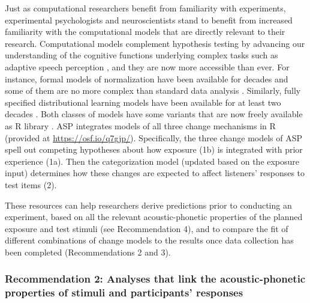 \documentclass[
  11pt,
  man,floatsintext]{apa6}
\begin{document}
Just as computational researchers benefit from familiarity with experiments, experimental psychologists and neuroscientists stand to benefit from increased familiarity with the computational models that are directly relevant to their research. Computational models complement hypothesis testing by advancing our understanding of the cognitive functions underlying complex tasks such as adaptive speech perception \autocite{kriegeskorte2018}, and they are now more accessible than ever. For instance, formal models of normalization have been available for decades and some of them are no more complex than standard data analysis \autocite[e.g., linear regression for C-CuRE,][]{mcmurray-jongman2011}. Similarly, fully specified distributional learning models have been available for at least two decades \autocites[e.g., mixtures of Gaussians,][]{mcmurray2007,toscano-mcmurray2010,feldman2013}[exemplar models,][]{foulkes-hay2015,johnson2005,apfelbaum-mcmurray2015}[ideal adaptors,][]{kleinschmidt-jaeger2015}. Both classes of models have some variants that are now freely available as R library \autocites[e.g., for normalization: \texttt{phonTools},][]{barreda2015}[for changes in category representations: \texttt{beliefupdatr} and its extension \texttt{MVBeliefUpdatr},][]{kleinschmidt-jaeger2015}. ASP integrates models of all three change mechanisms in R (provided at \url{https://osf.io/q7gjp/}). Specifically, the three change models of ASP spell out competing hypotheses about how exposure (1b) is integrated with prior experience (1a). Then the categorization model (updated based on the exposure input) determines how these changes are expected to affect listeners' responses to test items (2).

These resources can help researchers derive predictions prior to conducting an experiment, based on all the relevant acoustic-phonetic properties of the planned exposure and test stimuli (see Recommendation 4), and to compare the fit of different combinations of change models to the results once data collection has been completed (Recommendations 2 and 3).

\hypertarget{recommendation-2-analyses-that-link-the-acoustic-phonetic-properties-of-stimuli-and-participants-responses}{%
\subsubsection{Recommendation 2: Analyses that link the acoustic-phonetic properties of stimuli and participants' responses}\label{recommendation-2-analyses-that-link-the-acoustic-phonetic-properties-of-stimuli-and-participants-responses}}
\end{document}
